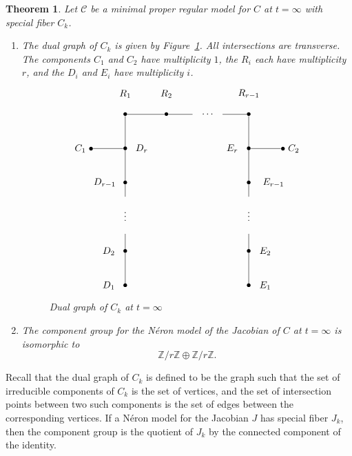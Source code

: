 \documentclass[reqno]{amsart}
\newtheorem{theorem}{Theorem}[section]
\theoremstyle{definition}
\theoremstyle{remark}
\def\Z{\mathbb{Z}}
\def\scd{\mathscr{C}}
\begin{document}
\begin{theorem}\label{thm:model-at-t-infty}
  Let $\scd$ be a minimal proper regular model for $C$ at $t = \infty$ with special fiber $C_k$.
  \begin{enumerate}
      \item The dual graph of $C_k$ is given by Figure~\ref{fig:superelliptic-dual-graph}. All intersections are transverse. The components $C_1$ and $C_2$ have multiplicity $1$, the $R_i$ each have multiplicity $r$, and the $D_i$ and $E_i$ have multiplicity $i$.
\begin{figure}[h]\centering
\[
\xygraph{
  !{<0cm,0cm>;<1.5cm,0cm>:<0cm,1.25cm>::}
  !{(1,5) }*{\bullet}="r1"
  !{(2,5) }*{\bullet}="r2"
  !{(3,5) }*{\quad\cdots\quad}="rspace"
  !{(4,5) }*{\bullet}="rrm"
  !{(1,5.6) }*{R_1}
  !{(2,5.6) }*{R_2}
  !{(4,5.6) }*{R_{r-1}}
  !{(0,4) }*{C_1\;\bullet}="c1"
  !{(5,4) }*{\bullet\; C_2}="c2"
  !{(1,0) }*{\bullet}="d1"
  !{(1,1) }*{\bullet}="d2"
  !{(1,1.5) }*{}="dbelow"
  !{(1,2.1) }*{\vdots}="dspace"
  !{(1,2.6) }*{}="dabove"
  !{(1,3) }*{\bullet}="drm"
  !{(1,4) }*{\bullet}="dr"
  !{(.6,0) }*{D_1}
  !{(.6,1) }*{D_2}
  !{(.5,3) }*{D_{r-1}}
  !{(1.4,4) }*{D_r}
  !{(4,0) }*{\bullet}="e1"
  !{(4,1) }*{\bullet}="e2"
  !{(4,1.5) }*{}="ebelow"
  !{(4,2.1) }*{\vdots}="espace"
  !{(4,2.6) }*{}="eabove"
  !{(4,3) }*{\bullet}="erm"
  !{(4,4) }*{\bullet}="er"
  !{(4.4,0) }*{E_1}
  !{(4.4,1) }*{E_2}
  !{(4.6,3) }*{E_{r-1}}
  !{(3.6,4) }*{E_r}
  "r1"-"r2"
  "r2"-"rspace"
  "rspace"-"rrm"
  "r1"-"dr"
  "c1"-"dr"
  "dr"-"drm"
  "drm"-"dabove"
  "dbelow"-"d2"
  "d2"-"d1"
  "rrm"-"er"
  "c2"-"er"
  "er"-"erm"
  "erm"-"eabove"
  "ebelow"-"e2"
  "e2"-"e1"
}
\]

\caption{Dual graph of $C_k$ at $t = \infty$}
\label{fig:superelliptic-dual-graph}
\end{figure}
  \item  The component group for the N\'eron model of the Jacobian of $C$ at $t = \infty$ is isomorphic to
  \[
  {\Z}/{r\Z} \oplus {\Z}/{r\Z}.
  \]
\end{enumerate}
\end{theorem}

Recall that the dual graph of $C_k$ is defined to be the graph such that the set of irreducible components of $C_k$ is the set of vertices, and the set of intersection points between two such components is the set of edges between the corresponding vertices. If a N\'eron model for the Jacobian $J$ has special fiber $J_k$, then the component group is the quotient of $J_k$ by the connected component of the identity.
\end{document}
